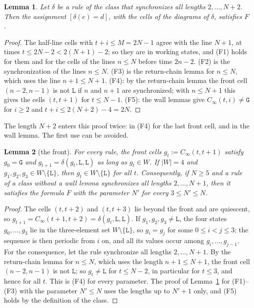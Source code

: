 \documentclass[11pt]{article}
\newtheorem{lemma}{Lemma}
\theoremstyle{remark}
\newcommand{\Lq}{\mathtt{L}}\newcommand{\Gq}{\mathtt{G}}\newcommand{\Aq}{\mathtt{A}}\newcommand{\Bq}{\mathtt{B}}\newcommand{\Fq}{\mathtt{F}}
\begin{document}
\begin{lemma}\label{lem:Fsound}
Let $\delta$ be a rule of the class that synchronizes all lengths $2,\dots,N+2$. Then the assignment
$[\delta(e)=d]$, with the cells of the diagrams of $\delta$, satisfies $F$.
\end{lemma}
\begin{proof}
The half-line cells with $t+i\le M=2N-1$ agree with the line $N+1$, at times $t\le 2N-2<2(N+1)-2$; so they are
in working states, and (F1) holds for them and for the cells of the lines $n\le N$ before time $2n-2$. (F2) is
the synchronization of the lines $n\le N$. (F3) is the return-chain lemma for $n\le N$, which uses the line
$n+1\le N+1$. (F4): by the return-chain lemma the front cell $(n-2,n-1)$ is not $\Lq$ if $n$ and $n+1$ are
synchronized; with $n\le N+1$ this gives the cells $(t,t+1)$ for $t\le N-1$. (F5): the wall lemmas give
$C_\infty(t,i)\ne\Gq$ for $i\ge2$ and $t+i\le 2(N+2)-4=2N$.
\end{proof}

The length $N+2$ enters this proof twice: in (F4) for the last front cell, and in the wall lemma. The first
use can be avoided.

\begin{lemma}[the front]\label{lem:front}
For every rule, the front cells $g_t:=C_\infty(t,t+1)$ satisfy $g_0=\Gq$ and
$g_{t+1}=\delta(g_t,\Lq,\Lq)$ as long as $g_t\in W$. If $|W|=4$ and $g_1,g_2,g_3\in W\setminus\{\Lq\}$, then
$g_t\in W\setminus\{\Lq\}$ for all $t$. Consequently, if $N\ge5$ and a rule of a class without a wall lemma
synchronizes all lengths $2,\dots,N+1$, then it satisfies the formula $F$ with the parameter $N'$ for every
$3\le N'\le N$.
\end{lemma}

\begin{proof}
The cells $(t,t+2)$ and $(t,t+3)$ lie beyond the front and are quiescent, so
$g_{t+1}=C_\infty(t+1,t+2)=\delta(g_t,\Lq,\Lq)$. If $g_1,g_2,g_3\ne\Lq$, the four states $g_0,\dots,g_3$ lie
in the three-element set $W\setminus\{\Lq\}$, so $g_i=g_j$ for some $0\le i<j\le3$; the sequence is then
periodic from $i$ on, and all its values occur among $g_i,\dots,g_{j-1}$. For the consequence, let the rule
synchronize all lengths $2,\dots,N+1$. By the return-chain lemma for $n\le N$, which uses the length
$n+1\le N+1$, the front cell $(n-2,n-1)$ is not $\Lq$; so $g_t\ne\Lq$ for $t\le N-2$, in particular for
$t\le3$, and hence for all $t$. This is (F4) for every parameter. The proof of Lemma~\ref{lem:Fsound} for
(F1)--(F3) with the parameter $N'\le N$ uses the lengths up to $N'+1$ only, and (F5) holds by the definition
of the class.
\end{proof}
\end{document}
